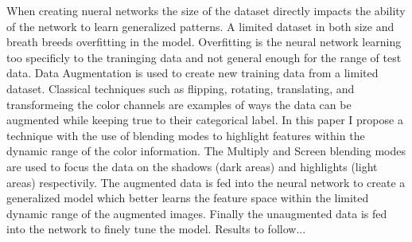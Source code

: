 % 
% 
%
When creating nueral networks the size of the dataset directly impacts the ability of the network to learn generalized patterns.  A limited dataset in both size and breath breeds overfitting in the model.  Overfitting is the neural network learning too specificly to the traninging data and not general enough for the range of test data.  Data Augmentation is used to create new training data from a limited dataset.  Classical techniques such as flipping, rotating, translating, and transformeing the color channels are examples of ways the data can be augmented while keeping true to their categorical label.  In this paper I propose a technique with the use of blending modes to highlight features within the dynamic range of the color information.  The Multiply and Screen blending modes are used to focus the data on the shadows (dark areas) and highlights (light areas) respectivily.  The augmented data is fed into the neural network to create a generalized model which better learns the feature space within the limited dynamic range of the augmented images.  Finally the unaugmented data is fed into the network to finely tune the model.  Results to follow...